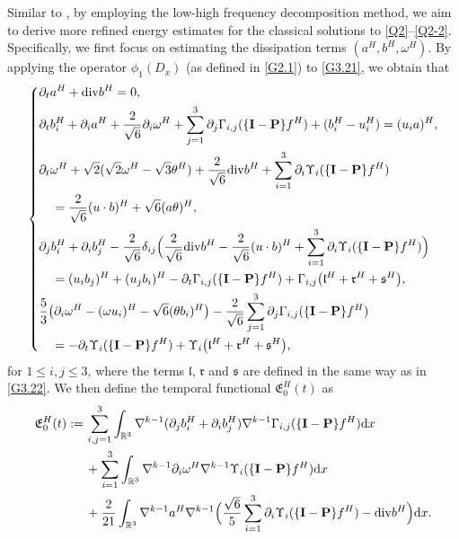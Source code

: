 \documentclass[reqno,11pt]{amsart}
\theoremstyle{plain}
\numberwithin{equation}{section}
\begin{document}
Similar to \cite{Ww-CMS-2024,LNW-arXiv}, by employing the low-high frequency decomposition method, we aim to derive more refined energy estimates for the classical solutions to \eqref{Q2}--\eqref{Q2-2}. Specifically, we first focus on estimating the dissipation terms $(a^H, b^H, \omega^H)$. By applying the operator $\phi_1(D_x)$ (as defined in \eqref{G2.1}) to  \eqref{G3.21}, we obtain that  
\begin{equation}\label{G5.27}
\left\{\begin{aligned}
&\partial_t a^H+{\rm div} b^H=0,\\
& \partial_t b^H_i+\partial_i a^H+\frac{2}{\sqrt{6}} \partial_i \omega^H+\sum_{j=1}^3 \partial_{j} \Gamma_{i, j}(\{\mathbf{I}-\mathbf{P}\} f^H)+(b_i^H-u_i^H)= (u_i a)^H, \\
& \partial_t \omega^H+\sqrt{2}(\sqrt{2} \omega^H-\sqrt{3} \theta^H)+\frac{2}{\sqrt{6}} {\rm div}  b^H    +\sum_{i=1}^3 \partial_{i} \Upsilon_i(\{\mathbf{I}-\mathbf{P}\} f^H) \\
&\quad=\frac{2}{\sqrt{6}} (u \cdot b)^H+\sqrt{6} (a \theta)^H,     \\
& \partial_j b^H_i+\partial_i b^H_j -\frac{2}{\sqrt{6}} \delta_{i j}\Big(\frac{2}{\sqrt{6}} {\rm div}   b^H-\frac{2}{\sqrt{6}} (u \cdot b)^H+\sum_{i=1}^3 \partial_{ i} \Upsilon_i(\{\mathbf{I}-\mathbf{P}\} f^H)\Big) \\
&\quad = (u_i b_j)^H+(u_j b_i )^H  -\partial_t \Gamma_{i, j}(\{\mathbf{I}-\mathbf{P}\} f^H)+\Gamma_{i, j}\big(\mathfrak{l}^H+\mathfrak{r}^H+\mathfrak{s}^H\big), \\
& \frac{5}{3} \big(\partial_i \omega^H-(\omega u_i)^H-\sqrt{6} (\theta b_i)^H \big)-\frac{2}{\sqrt{6}} \sum_{j=1}^3 \partial_{j} \Gamma_{i, j}(\{\mathbf{I}-\mathbf{P}\} f^H)   \\
&\quad=-\partial_t \Upsilon_i(\{\mathbf{I}-\mathbf{P}\} f^H)+\Upsilon_i\big(\mathfrak{l}^H+\mathfrak{r}^H+\mathfrak{s}^H\big),
\end{aligned}\right.
\end{equation}
for $1\leq i,j\leq 3$, where the terms $\mathfrak{l}$, $\mathfrak{r}$ and $\mathfrak{s}$ are  defined
in the same way  as 
  in \eqref{G3.22}.
We then define the temporal functional $\mathfrak{E}_0^H(t)$ as  %
\begin{align}\label{G5.28}
\mathfrak{E}_0^H(t) :=\, &  \sum_{i, j=1}^3 \int_{\mathbb{R}^3} \nabla^{k-1} (\partial_j b_i^H+\partial_i b_j^H ) \nabla^{k-1} \Gamma_{i, j}(\{\mathbf{I}-\mathbf{P}\} f^H) \mathrm{d} x \nonumber\\
& + \sum_{i=1}^3 \int_{\mathbb{R}^3}  \nabla^{k-1} \partial_i \omega^H  \nabla^{k-1} \Upsilon_i(\{\mathbf{I}-\mathbf{P}\} f^H) \mathrm{d} x \nonumber\\
& +\frac{2}{21} \int_{\mathbb{R}^3} \nabla^{k-1} a^H \nabla^{k-1}\Big(\frac{\sqrt{6}}{5} \sum_{i=1}^3 \partial_{i} \Upsilon_i(\{\mathbf{I}-\mathbf{P}\} f^H)-{\rm div}  b^H\Big) \mathrm{d} x .
\end{align} 
\end{document}
